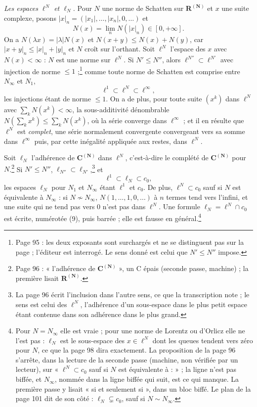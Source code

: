 \documentclass[11pt,a4paper]{article}
\begin{document}
\emph{Les espaces $\ell^N$ et $\ell_N$.} Pour $N$ une norme de Schatten sur
$\mathbf{R}^{(\mathbf{N})}$ et $x$ une suite complexe, posons $|x|_n =
(|x_1|, \ldots, |x_n|, 0, \ldots)$ et
\[
  N(x) = \lim_n N(|x|_n) \in [0, +\infty] .
\]
On a $N(\lambda x) = |\lambda| N(x)$ et $N(x+y) \leq N(x) + N(y)$, car
$|x+y|_n \leq |x|_n + |y|_n$ et $N$ croît sur l'orthant. Soit $\ell^N$
l'espace des $x$ avec $N(x) < \infty$ : $N$ est une norme sur $\ell^N$. Si
$N' \leq N''$, alors $\ell^{N''} \subset \ell^{N'}$ avec injection de norme
$\leq 1$ ;\footnote{Page 95 : les deux exposants sont surchargés et ne se
distinguent pas sur la page ; l'éditeur est interrogé. Le sens donné est
celui que $N' \leq N''$ impose.} comme toute norme de Schatten est comprise entre $N_\infty$ et
$N_1$,
\[
  \ell^1 \subset \ell^N \subset \ell^\infty,
\]
les injections étant de norme $\leq 1$. On a de plus, pour toute suite
$(x^k)$ dans $\ell^N$ avec $\sum_k N(x^k) < \infty$, la sous-additivité
dénombrable $N(\sum_k x^k) \leq \sum_k N(x^k)$, où la série converge dans
$\ell^\infty$ ; et il en résulte que $\ell^N$ est \emph{complet}, une série
normalement convergente convergeant vers sa somme dans $\ell^\infty$ puis,
par cette inégalité appliquée aux restes, dans $\ell^N$.

Soit $\ell_N$ l'adhérence de $\mathbf{C}^{(\mathbf{N})}$ dans $\ell^N$,
c'est-à-dire le complété de $\mathbf{C}^{(\mathbf{N})}$ pour $N$.\footnote{Page
96 : « l'adhérence de $\mathbf{C}^{(\mathbf{N})}$ », un C épais (seconde
passe, machine) ; la première lisait $\mathbf{R}^{(\mathbf{N})}$.} Si $N' \leq
N''$, $\ell_{N''} \subset \ell_{N'}$,\footnote{La page 96 écrit
l'inclusion dans l'autre sens, ce que la transcription note ; le sens est
celui des $\ell^N$, l'adhérence d'un sous-espace dans le plus petit espace
étant contenue dans son adhérence dans le plus grand.} et
\[
  \ell^1 \subset \ell_N \subset c_0,
\]
les espaces $\ell_N$ pour $N_1$ et $N_\infty$ étant $\ell^1$ et $c_0$. De
plus, $\ell^N \subset c_0$ sauf si $N$ est équivalente à $N_\infty$ : si $N
\not\sim N_\infty$, $N(1, \ldots, 1, 0, \ldots)$ à $n$ termes tend vers
l'infini, et une suite qui ne tend pas vers $0$ n'est pas dans $\ell^N$. Une
formule $\ell_N = \ell^N \cap c_0$ est écrite, numérotée (9), puis barrée ;
elle est fausse en général.\footnote{Pour $N = N_\infty$ elle est vraie ;
pour une norme de Lorentz ou d'Orlicz elle ne l'est pas : $\ell_N$ est le
sous-espace des $x \in \ell^N$ dont les queues tendent vers zéro pour $N$,
ce que la page 98 dira exactement. La proposition de la page 96 s'arrête,
dans la lecture de la seconde passe (machine, non vérifiée par un lecteur),
sur « $\ell^N \subset c_0$ sauf si $N$ est équivalente à : » ; la ligne
n'est pas biffée, et $N_\infty$, nommée dans la ligne biffée qui suit, est ce
qui manque. La première passe y lisait « si et seulement si », dans un bloc
biffé. Le plan de la page 101 dit de son côté : $\ell_N \subsetneq c_0$, sauf
si $N \sim N_\infty$.}
\end{document}
